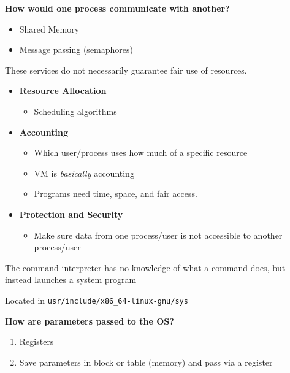 \documentclass{article}
\begin{document}
\textbf{How would one process communicate with another?}
\begin{itemize}
    \item Shared Memory
    \item Message passing (semaphores)
\end{itemize}

These services do not necessarily guarantee fair use of resources.

\begin{itemize}
    \item \textbf{Resource Allocation}
          \begin{itemize}
              \item Scheduling algorithms
          \end{itemize}
    \item \textbf{Accounting}
          \begin{itemize}
              \item Which user/process uses how much of a specific resource
              \item VM is \textit{basically} accounting
              \item Programs need time, space, and fair access.
          \end{itemize}
    \item \textbf{Protection and Security}
          \begin{itemize}
              \item Make sure data from one process/user is not accessible to another process/user
          \end{itemize}
\end{itemize}

The command interpreter has no knowledge of what a command does, but instead launches a system program

Located in \texttt{usr/include/x86\_64-linux-gnu/sys}

\textbf{How are parameters passed to the OS?}
\begin{enumerate}
    \item Registers
    \item Save parameters in block or table (memory) and pass via a register
\end{enumerate}
\end{document}
